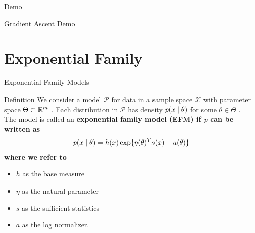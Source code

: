\documentclass[10pt]{beamer}
\begin{document}
\begin{frame}{Demo}
\begin{center}
\href{https://colab.research.google.com/drive/1PokSTCC1u0QWghxLVWhS30ycVRWjNMbG}{Gradient Ascent Demo}
\end{center}
\end{frame}

\section{Exponential Family}


\begin{frame}{Exponential Family Models}

\begin{sblock}{Definition}
We consider a model $\mathcal{P}$ for data in a sample space $\mathcal{X}$ with parameter space $\Theta \subset \mathbb{R}^m$ . Each distribution in $\mathcal{P}$ has density $p(x \; | \; \theta)$ for some $\theta \in \Theta$ . \\
\vfill
The model is called an \bf{exponential family model} (EFM) if $p$ can be written as
\begin{align*}
 p(x \; | \; \theta) = h(x) \exp \{ \eta(\theta)^T s(x) - a(\theta)\} 
 \end{align*}
where we refer to 
\begin{itemize}
\item $h$ as the base measure
\item  $\eta$ as the natural parameter
\item $s$ as the sufficient statistics
\item $a$ as the log normalizer. 
\end{itemize}
\end{sblock}
\end{frame}
\end{document}
